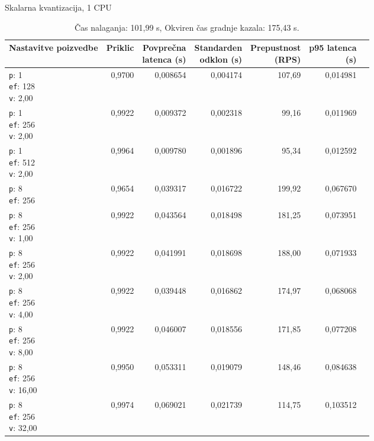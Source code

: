 \begin{table}[htbp]
  \centering
\small
  \caption{Skalarna kvantizacija, 1 CPU}
  \label{tab:single-1cpu-4ram:sq:qdrant-dipl-baseline-tenant-subgraph-sq-ext-m16-ef-128-random-768-100-tenants-extended-upload-2026-08-18-09-14-42.json}
  \begin{tabularx}{\textwidth}{Xrrrrrr}
    \toprule
    Nastavitve poizvedbe & Priklic & \makecell{Povprečna\\latenca (s)} & \makecell{Standarden\\odklon (s)} & \makecell{Prepustnost\\(RPS)} & \makecell{p95 latenca\\(s)}  \\
    \midrule
    \makecell{\texttt{p}: 1\\\texttt{ef}: 128\\\texttt{v}: 2,00} & 0,9700 & 0,008654 & 0,004174 & 107,69 & 0,014981 \\
    \makecell{\texttt{p}: 1\\\texttt{ef}: 256\\\texttt{v}: 2,00} & 0,9922 & 0,009372 & 0,002318 & 99,16 & 0,011969 \\
    \makecell{\texttt{p}: 1\\\texttt{ef}: 512\\\texttt{v}: 2,00} & 0,9964 & 0,009780 & 0,001896 & 95,34 & 0,012592 \\
    \makecell{\texttt{p}: 8\\\texttt{ef}: 256} & 0,9654 & 0,039317 & 0,016722 & 199,92 & 0,067670 \\
    \makecell{\texttt{p}: 8\\\texttt{ef}: 256\\\texttt{v}: 1,00} & 0,9922 & 0,043564 & 0,018498 & 181,25 & 0,073951 \\
    \makecell{\texttt{p}: 8\\\texttt{ef}: 256\\\texttt{v}: 2,00} & 0,9922 & 0,041991 & 0,018698 & 188,00 & 0,071933 \\
    \makecell{\texttt{p}: 8\\\texttt{ef}: 256\\\texttt{v}: 4,00} & 0,9922 & 0,039448 & 0,016862 & 174,97 & 0,068068 \\
    \makecell{\texttt{p}: 8\\\texttt{ef}: 256\\\texttt{v}: 8,00} & 0,9922 & 0,046007 & 0,018556 & 171,85 & 0,077208 \\
    \makecell{\texttt{p}: 8\\\texttt{ef}: 256\\\texttt{v}: 16,00} & 0,9950 & 0,053311 & 0,019079 & 148,46 & 0,084638 \\
    \makecell{\texttt{p}: 8\\\texttt{ef}: 256\\\texttt{v}: 32,00} & 0,9974 & 0,069021 & 0,021739 & 114,75 & 0,103512 \\
    \bottomrule
  \end{tabularx}
\caption* {Čas nalaganja: 101,99 s, Okviren čas gradnje kazala: 175,43 s.}\end{table}

